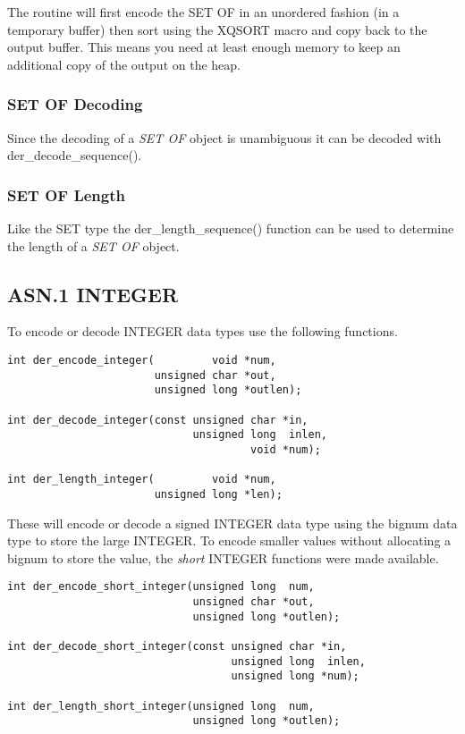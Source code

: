 \documentclass[synpaper]{book}
\begin{document}
The routine will first encode the SET OF in an unordered fashion (in a temporary buffer) then sort using the XQSORT macro and copy back to the output buffer.  This
means you need at least enough memory to keep an additional copy of the output on the heap.

\subsubsection{SET OF Decoding}
Since the decoding of a \textit{SET OF} object is unambiguous it can be decoded with der\_decode\_sequence().

\subsubsection{SET OF Length}
Like the SET type the der\_length\_sequence() function can be used to determine the length of a \textit{SET OF} object.

\subsection{ASN.1 INTEGER}

To encode or decode INTEGER data types use the following functions.

\begin{verbatim}
int der_encode_integer(         void *num,
                       unsigned char *out,
                       unsigned long *outlen);

int der_decode_integer(const unsigned char *in,
                             unsigned long  inlen,
                                      void *num);

int der_length_integer(         void *num,
                       unsigned long *len);
\end{verbatim}

These will encode or decode a signed INTEGER data type using the bignum data type to store the large INTEGER.  To encode smaller values without allocating
a bignum to store the value, the \textit{short} INTEGER functions were made available.

\begin{verbatim}
int der_encode_short_integer(unsigned long  num,
                             unsigned char *out,
                             unsigned long *outlen);

int der_decode_short_integer(const unsigned char *in,
                                   unsigned long  inlen,
                                   unsigned long *num);

int der_length_short_integer(unsigned long  num,
                             unsigned long *outlen);
\end{verbatim}
\end{document}
